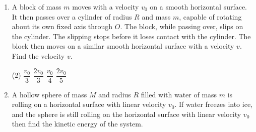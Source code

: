 \documentclass[11pt]{article}
\begin{document}
\begin{enumerate}
    \item A  block of mass $m$ moves with a velocity $v_0$ on a smooth horizontal surface. It then passes over a cylinder of radius $R$ and mass $m$, capable of rotating about its own fixed axis through $O$. The block, while passing over, slips on the cylinder. The slipping stops before it loses contact with the cylinder. The block then moves on a similar smooth horizontal surface with a velocity $v$. Find the velocity $v$.
    \begin{center}
        \end{center}
    \begin{tasks}(2)
        \task $\dfrac{v_0}{3}$
        \task $\dfrac{2v_0}{3}$\ans
        \task $\dfrac{v_0}{4}$
        \task $\dfrac{2v_0}{5}$
    \end{tasks}

    \item A hollow sphere of mass $M$ and radius $R$ filled with water of mass $m$ is rolling on a horizontal surface with linear velocity $v_0$. If water freezes into ice, and the sphere is still rolling on the horizontal surface with linear velocity $v_0$ then find the kinetic energy of the system.
    \begin{center}
\end{center}
\end{enumerate}
\end{document}
